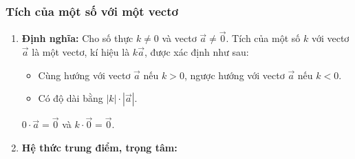 \subsubsection{Tích của một số với một vectơ}
\begin{enumerate}[\iconMT]
	\item \textbf{Định nghĩa:} Cho số thực $k\ne 0$ và vectơ $\vec{a} \ne \vec{0}$. Tích của một số $k$ với vectơ $\vec{a}$ là một vectơ, kí hiệu là $k\vec{a}$, được xác định như sau:
	 \begin{itemize}
	 \item Cùng hướng với vectơ $\vec{a}$ nếu $k>0$, ngược hướng với vectơ $\vec{a}$ nếu $k<0$.
	 \item Có độ dài bằng $|k| \cdot |\vec{a}|$.
	 \end{itemize}
	 \begin{note}
	 $0\cdot \vec{a}=\vec{0}$ và $k\cdot \vec{0}=\vec{0}$.
	 \end{note}
	\item \textbf{Hệ thức trung điểm, trọng tâm:}
\end{enumerate}
